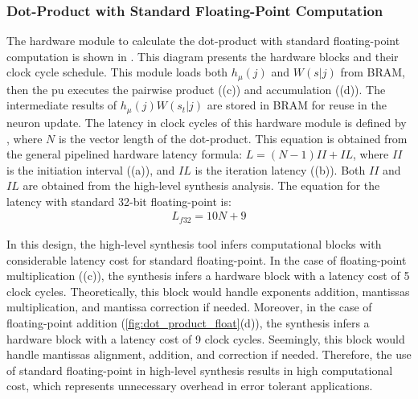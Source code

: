\subsubsection{Dot-Product with Standard Floating-Point Computation}
 The hardware module to calculate the dot-product with standard floating-point computation is shown in . This diagram presents the hardware blocks and their clock cycle schedule. This module loads both $h_\mu(j)$ and $W(s|j)$ from BRAM, then the \gls{pu} executes the pairwise product ((c)) and accumulation ((d)). The intermediate results of $h_\mu(j) W(s_t|j)$ are stored in BRAM for reuse in the neuron update. The latency in clock cycles of this hardware module is defined by , where $N$ is the vector length of the dot-product. This equation is obtained from the general pipelined hardware latency formula: $L=\left(N-1\right)II+IL$, where $II$ is the initiation interval ((a)), and $IL$ is the iteration latency ((b)). Both $II$ and $IL$ are obtained from the high-level synthesis analysis. The equation for the latency with standard 32-bit floating-point is:
 \begin{eqnarray} \label{eq:dot_standard_float_latency}
 L_{f32}=10N+9
 \end{eqnarray}
 
In this design, the high-level synthesis tool infers computational blocks with considerable latency cost for standard floating-point. In the case of floating-point multiplication ((c)), the synthesis infers a hardware block with a latency cost of 5 clock cycles. Theoretically, this block would handle exponents addition, mantissas multiplication, and mantissa correction if needed. Moreover, in the case of floating-point addition (\ref{fig:dot_product_float}(d)), the synthesis infers a hardware block with a latency cost of 9 clock cycles. Seemingly, this block would handle mantissas alignment, addition, and correction if needed. Therefore, the use of standard floating-point in high-level synthesis results in high computational cost, which represents unnecessary overhead in error tolerant applications.


